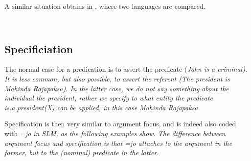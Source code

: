
A similar situation obtains in , where two languages are compared.

\\ 


% 



\subsection{Specificiation}\label{sec:disc:Specificiation}
The normal case for a predication is to assert the predicate (\em John is a criminal\em). It is less common, but also possible, to assert the referent (\em The president is Mahinda Rajapaksa\em). In the latter case, we do not say something about the individual \em the president\em, rather we specify to what entity the predicate is.a.president(X) can be applied, in this case \em Mahinda Rajapaksa\em.

Specification is then very similar to argument focus, and is indeed also coded with \em =jo \em in SLM, as the following examples show. The difference between argument focus and specification is that \em =jo \em attaches to the argument in the former, but to the (nominal) predicate in the latter.


